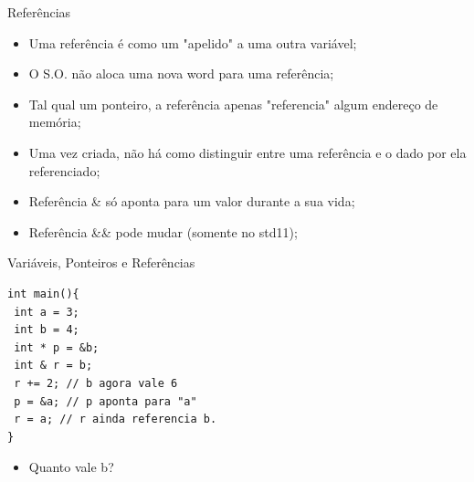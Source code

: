 \documentclass[12pt,table,xcolor={dvipsnames}]{beamer}
\begin{document}
\begin{frame}[fragile]{Referências}
\begin{itemize}
\item Uma referência é como um "apelido" a uma outra variável;
\item O S.O. não aloca uma nova word para uma referência;
\item Tal qual um ponteiro, a referência apenas "referencia" algum endereço de memória;
\item Uma vez criada, não há como distinguir entre uma referência e o dado por ela referenciado;
\item Referência \& só aponta para um valor durante a sua vida;
\item Referência \&\& pode mudar (somente no std11);
\end{itemize}
\end{frame}

\begin{frame}[fragile]{Variáveis, Ponteiros e Referências}
\begin{lstlisting}
int main(){
 int a = 3;
 int b = 4;
 int * p = &b;
 int & r = b;
 r += 2; // b agora vale 6
 p = &a; // p aponta para "a"
 r = a; // r ainda referencia b.
}
\end{lstlisting}
\begin{itemize}
\item Quanto vale b?
\end{itemize}
\end{frame}
\end{document}
